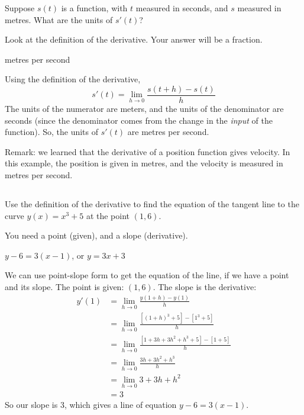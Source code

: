 \begin{Mquestion}
Suppose $s(t)$ is a function, with $t$ measured in seconds, and $s$ measured in metres. What are the units of $s'(t)$?
\end{Mquestion}
\begin{hint}
Look at the definition of the derivative. Your answer will be a fraction.
\end{hint}
\begin{answer} metres per second
\end{answer}
\begin{solution}
Using the definition of the derivative,
\[s'(t)=\lim_{h \to 0}\frac{s(t+h)-s(t)}{h}\]
The units of the numerator are meters, and the units of the denominator are seconds (since the denominator comes from the change in the \emph{input} of the function). So, the units of $s'(t)$ are metres per second.

Remark: we learned that the derivative of a position function gives velocity. In this example, the position is given in metres, and the velocity is measured in metres per second.
\end{solution}




\subsection*{\Procedural}




\begin{question}Use the definition of the derivative to find the equation of the tangent line to the curve $y(x)=x^3+5$ at the point $(1,6)$.
\end{question}
\begin{hint} You need a point (given), and a slope (derivative).
\end{hint}
\begin{answer} $y-6=3(x-1)$, or $y=3x +3$
\end{answer}
\begin{solution}
We can use point-slope form to get the equation of the line, if we have a point and its slope. The point is given: $(1,6)$. The slope is the derivative:
\begin{align*}
y'(1)&=\lim_{h \rightarrow 0}\frac{y(1+h)-y(1)}{h}\\
&=\lim_{h \rightarrow 0}\frac{[(1+h)^3+5]-[1^3+5]}{h}\\
&=\lim_{h \rightarrow 0}\frac{[1+3h+3h^2+h^3+5]-[1+5]}{h}\\
&=\lim_{h \rightarrow 0}\frac{3h+3h^2+h^3}{h}\\
&=\lim_{h \rightarrow 0}{3+3h+h^2}\\
&=3
\end{align*}
So our slope is 3, which gives a line of equation
$y-6=3(x-1)$.
\end{solution}



